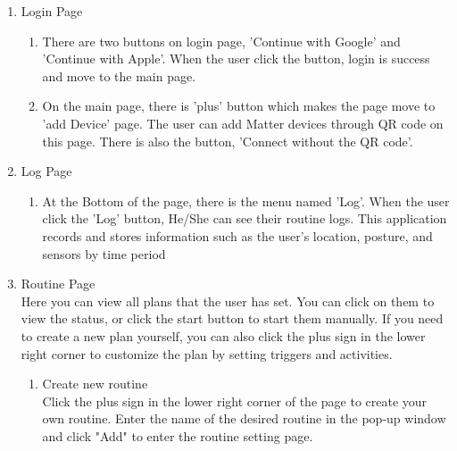 \begin{enumerate}[label=\arabic*.]
    \item {\large{Login Page}}
    \begin{enumerate}[label=\alph*]
        \item There are two buttons on login page, 'Continue with Google' and 'Continue with Apple'. When the user click the button, login is success and move to the main page.
        \item On the main page, there is 'plus' button which makes the page move to 'add Device' page. The user can add Matter devices through QR code on this page. There is also the button, 'Connect without the QR code'. 
    \end{enumerate}
    \item {\large{Log Page}}
    \begin{enumerate}[label=\alph*]
        \item At the Bottom of the page, there is the menu named 'Log'. When the user click the 'Log' button, He/She can see their routine logs. This application records and stores information such as the user's location, posture, and sensors by time period 
    \end{enumerate}
    \item {\large{Routine Page}}\\
    Here you can view all plans that the user has set. You can click on them to view the status, or click the start button to start them manually. If you need to create a new plan yourself, you can also click the plus sign in the lower right corner to customize the plan by setting triggers and activities.\\
    \begin{enumerate}[label=\alph*]
        \item Create new routine\\
            Click the plus sign in the lower right corner of the page to create your own routine. Enter the name of the desired routine in the pop-up window and click "Add" to enter the routine setting page.\\


\end{enumerate}
\end{enumerate}
